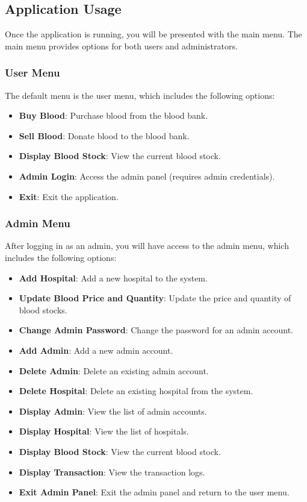 \documentclass[12pt,a4paper]{report}
\begin{document}
\subsection{Application Usage}
Once the application is running, you will be presented with the main menu. The main menu provides options for both users and administrators.

\subsubsection{User Menu}
The default menu is the user menu, which includes the following options:
\begin{itemize}
    \item \normalsize \textbf{Buy Blood}: Purchase blood from the blood bank.
    \item \normalsize \textbf{Sell Blood}: Donate blood to the blood bank.
    \item \normalsize \textbf{Display Blood Stock}: View the current blood stock.
    \item \normalsize \textbf{Admin Login}: Access the admin panel (requires admin credentials).
    \item \normalsize \textbf{Exit}: Exit the application.
\end{itemize}

\subsubsection{Admin Menu}
After logging in as an admin, you will have access to the admin menu, which includes the following options:
\begin{itemize}
    \item \normalsize \textbf{Add Hospital}: Add a new hospital to the system.
    \item \normalsize \textbf{Update Blood Price and Quantity}: Update the price and quantity of blood stocks.
    \item \normalsize \textbf{Change Admin Password}: Change the password for an admin account.
    \item \normalsize \textbf{Add Admin}: Add a new admin account.
    \item \normalsize \textbf{Delete Admin}: Delete an existing admin account.
    \item \normalsize \textbf{Delete Hospital}: Delete an existing hospital from the system.
    \item \normalsize \textbf{Display Admin}: View the list of admin accounts.
    \item \normalsize \textbf{Display Hospital}: View the list of hospitals.
    \item \normalsize \textbf{Display Blood Stock}: View the current blood stock.
    \item \normalsize \textbf{Display Transaction}: View the transaction logs.
    \item \normalsize \textbf{Exit Admin Panel}: Exit the admin panel and return to the user menu.
\end{itemize}
\end{document}
